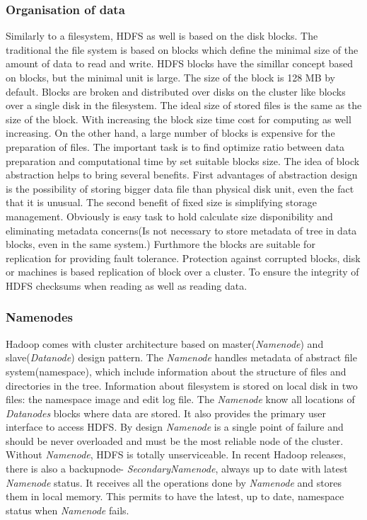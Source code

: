 \documentclass[a4paper,12pt,oneside]{report}
\begin{document}
		\subsubsection{Organisation of data}
Similarly to  a filesystem, HDFS as well is based on the disk blocks. The traditional
 the file system is based on blocks which define the minimal size of the amount of data to read and write. 
        HDFS blocks have the simillar concept based on blocks, but the minimal unit is
         large. The size of the block is 128 MB by default. Blocks are broken and distributed
          over disks on the cluster like blocks over a single disk in the filesystem. The ideal 
          size of stored files is the same as the size of the block. With increasing the block 
          size time cost for computing as well increasing.  On the other hand, a large number
           of blocks is expensive for the preparation of files. The important task is to find optimize 
            ratio between data preparation and computational time by set suitable blocks size.
        The idea of block abstraction helps to bring several benefits. First advantages of
         abstraction design is the possibility of storing bigger data file than physical disk unit, 
         even the fact that it is unusual.
        The second benefit of fixed size is simplifying storage management. Obviously is easy task
         to hold calculate size disponibility and eliminating metadata concerns(Is  not necessary 
         to store metadata of tree in data blocks, even in the same system.)
        Furthmore the blocks are suitable for replication for providing fault tolerance. Protection
         against corrupted blocks, disk or machines is based replication of block over a cluster. 
         To ensure the integrity of HDFS checksums when reading as well as reading data.
        
        
		

		\subsubsection{Namenodes}
Hadoop comes with cluster architecture based on master(\emph{Namenode}) and\\ slave(\emph{Datanode}) design pattern. 
        The \emph{Namenode} handles metadata of abstract file system(namespace), which include
        information about the structure of files and directories in the tree. Information about filesystem is stored 
        on local disk in two files: the namespace image and edit log file. 
        The \emph{Namenode} know all locations of  \emph{Datanodes} blocks where data 
        are stored. It also provides the primary user interface to access HDFS. 
        By design \emph{Namenode}  is a single point of failure and should be never overloaded and must be the most reliable node of the cluster.  Without \emph{Namenode}, HDFS is totally unserviceable. In recent Hadoop releases, there is also a backupnode- \emph{SecondaryNamenode}, always up to date with latest \emph{Namenode} status. It receives all the operations done by \emph{Namenode} and stores them in local memory. This permits to have the latest, up to date, namespace status when \emph{Namenode} fails. 
\end{document}
